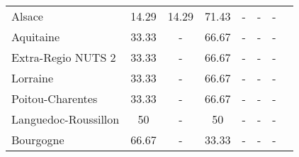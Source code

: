 \begin{table}[H]
\begin{tabularx}{\textwidth}{Xccccccc}
            Alsace & 14.29 & 14.29 & 71.43 & - & - & - \\
            Aquitaine & 33.33 & - & 66.67 & - & - & - \\
            Extra-Regio NUTS 2 & 33.33 & - & 66.67 & - & - & - \\
            Lorraine & 33.33 & - & 66.67 & - & - & - \\
            Poitou-Charentes & 33.33 & - & 66.67 & - & - & - \\
            Languedoc-Roussillon & 50 & - & 50 & - & - & - \\
            Bourgogne & 66.67 & - & 33.33 & - & - & - \\
        \bottomrule
    \end{tabularx}
\end{table}
        
